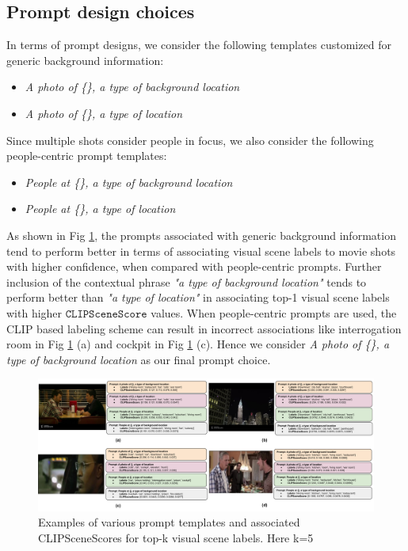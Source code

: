 \subsection{Prompt design choices}
In terms of prompt designs, we consider the following templates customized for generic background information:
\begin{itemize}
    \item \textit{A photo of \{\}, a type of background location}
    \item \textit{A photo of \{\}, a type of location}
\end{itemize}
Since multiple shots consider people in focus, we also consider the following people-centric prompt templates:

\begin{itemize}
    \item \textit{People at \{\}, a type of background location}
    \item \textit{People at \{\}, a type of location}
\end{itemize}

As shown in Fig \ref{Combined Prompt Setup}, the prompts associated with generic background information tend to perform better in terms of associating visual scene labels to movie shots with higher confidence, when compared with people-centric prompts. Further inclusion of the contextual phrase \textit{"a type of background location"} tends to perform better than \textit{"a type of location"} in associating top-1 visual scene labels with higher $\texttt{CLIPSceneScore}$ values. When people-centric prompts are used, the CLIP based labeling scheme can result in incorrect associations like interrogation room in Fig \ref{Combined Prompt Setup} (a) and cockpit in Fig \ref{Combined Prompt Setup} (c). Hence we consider \textit{A photo of \{\}, a type of background location} as our final prompt choice.
\begin{figure}[h!]
    \centering
    \includegraphics[width=\textwidth]{figures/Prompt_Design_combined_updated.pdf}
    \caption{Examples of various prompt templates and associated CLIPSceneScores for top-k visual scene labels. Here k=5}
    \label{Combined Prompt Setup}
\end{figure}

